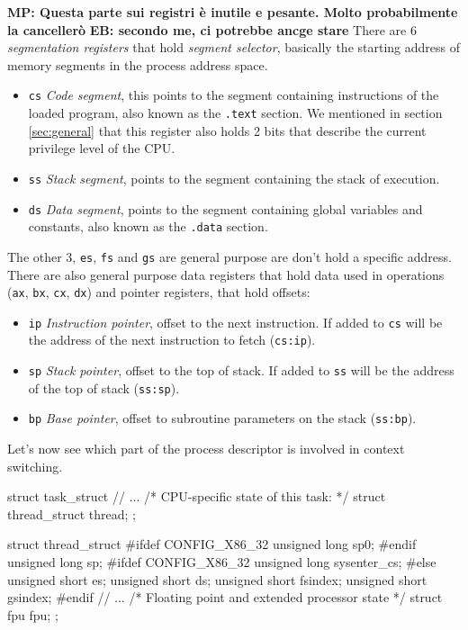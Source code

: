 \documentclass[10pt, oneside]{book}
\newcommand{\mycomment}[1]{\textbf{#1}}  %
\begin{document}
\mycomment{MP: Questa parte sui registri è inutile e pesante. Molto probabilmente la cancellerò}
\mycomment{EB: secondo me, ci potrebbe ancge stare}
There are 6 \textit{segmentation registers} that hold \textit{segment selector}, basically the starting address of memory segments in the process address space.
\begin{itemize}
    \item \verb|cs| \textit{Code segment}, this points to the segment containing instructions of the loaded program, also known as the \verb|.text| section. We mentioned in section \ref{sec:general} that this register also holds 2 bits that describe the current privilege level of the CPU.
    \item \verb|ss| \textit{Stack segment}, points to the segment containing the stack of execution.
    \item \verb|ds| \textit{Data segment}, points to the segment containing global variables and constants, also known as the \verb|.data| section.
\end{itemize}
The other 3, \verb|es|, \verb|fs| and \verb|gs| are general purpose are don't hold a specific address. There are also general purpose data registers that hold data used in operations (\verb|ax|, \verb|bx|, \verb|cx|, \verb|dx|) and pointer registers, that hold offsets:
\begin{itemize}
    \item \verb|ip| \textit{Instruction pointer}, offset to the next instruction. If added to \verb|cs| will be the address of the next instruction to fetch (\verb|cs:ip|).
    \item \verb|sp| \textit{Stack pointer}, offset to the top of stack. If added to \verb|ss| will be the address of the top of stack (\verb|ss:sp|).
    \item \verb|bp| \textit{Base pointer}, offset to subroutine parameters on the stack (\verb|ss:bp|).
\end{itemize}
Let's now see which part of the process descriptor is involved in context switching.
\begin{code}
struct task_struct {
    // ...
    /* CPU-specific state of this task: */
    struct thread_struct    thread;
};
\end{code}
\begin{code}
struct thread_struct {
#ifdef CONFIG_X86_32
    unsigned long sp0;
#endif
    unsigned long sp;
#ifdef CONFIG_X86_32
    unsigned long sysenter_cs;
#else
    unsigned short  es;
    unsigned short  ds;
    unsigned short  fsindex;
    unsigned short        gsindex;
#endif
    // ...
    /* Floating point and extended processor state */
    struct fpu      fpu;
};
\end{code}
\end{document}
